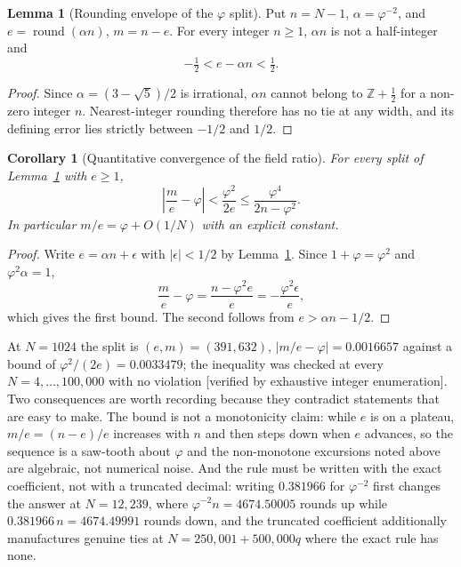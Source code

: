 \documentclass[11pt]{article}
\newtheorem{corollary}{Corollary}
\theoremstyle{definition}
\newtheorem{lemma}[theorem]{Lemma}
\begin{document}
\begin{lemma}[Rounding envelope of the $\varphi$ split]
\label{lem:phi-rounding-envelope}
Put $n=N-1$, $\alpha=\varphi^{-2}$, and $e=\operatorname{round}(\alpha n)$,
$m=n-e$. For every integer $n\geq1$, $\alpha n$ is not a half-integer and
\[
 -\tfrac12 < e-\alpha n < \tfrac12 .
\]
\end{lemma}
\begin{proof}
Since $\alpha=(3-\sqrt5)/2$ is irrational, $\alpha n$ cannot belong to
$\mathbb{Z}+\tfrac12$ for a non-zero integer $n$. Nearest-integer rounding
therefore has no tie at any width, and its defining error lies strictly between
$-1/2$ and $1/2$.
\end{proof}

\begin{corollary}[Quantitative convergence of the field ratio]
\label{cor:phi-ratio-bound}
For every split of Lemma~\ref{lem:phi-rounding-envelope} with $e\geq1$,
\[
 \left|\frac{m}{e}-\varphi\right|
 < \frac{\varphi^{2}}{2e}
 \leq \frac{\varphi^{4}}{2n-\varphi^{2}} .
\]
In particular $m/e=\varphi+O(1/N)$ with an explicit constant.
\end{corollary}
\begin{proof}
Write $e=\alpha n+\epsilon$ with $|\epsilon|<1/2$ by
Lemma~\ref{lem:phi-rounding-envelope}. Since $1+\varphi=\varphi^{2}$ and
$\varphi^{2}\alpha=1$,
\[
 \frac{m}{e}-\varphi=\frac{n-\varphi^{2}e}{e}=-\frac{\varphi^{2}\epsilon}{e},
\]
which gives the first bound. The second follows from $e>\alpha n-1/2$.
\end{proof}

At $N=1024$ the split is $(e,m)=(391,632)$, $|m/e-\varphi|=0.0016657$ against a
bound of $\varphi^{2}/(2e)=0.0033479$; the inequality was checked at every
$N=4,\dots,100{,}000$ with no violation [verified by exhaustive integer
enumeration]. Two consequences are worth recording because they contradict
statements that are easy to make. The bound is not a monotonicity claim: while
$e$ is on a plateau, $m/e=(n-e)/e$ increases with $n$ and then steps down when
$e$ advances, so the sequence is a saw-tooth about $\varphi$ and the non-monotone
excursions noted above are algebraic, not numerical noise. And the rule must be
written with the exact coefficient, not with a truncated decimal: writing
$0.381966$ for $\varphi^{-2}$ first changes the answer at $N=12{,}239$, where
$\varphi^{-2}n=4674.50005$ rounds up while $0.381966\,n=4674.49991$ rounds down,
and the truncated coefficient additionally manufactures genuine ties at
$N=250{,}001+500{,}000q$ where the exact rule has none.
\end{document}
